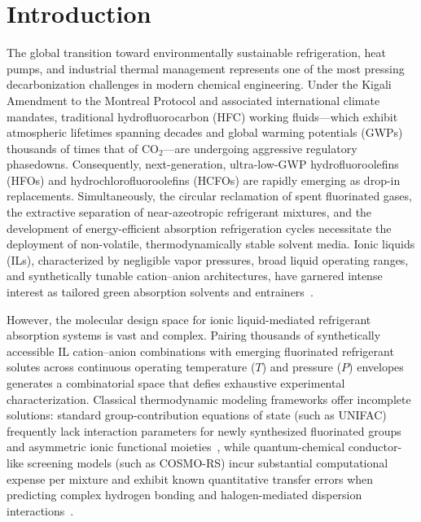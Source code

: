 \section{Introduction}
\label{sec:introduction}

The global transition toward environmentally sustainable refrigeration, heat pumps, and industrial thermal management represents one of the most pressing decarbonization challenges in modern chemical engineering. Under the Kigali Amendment to the Montreal Protocol and associated international climate mandates, traditional hydrofluorocarbon (HFC) working fluids---which exhibit atmospheric lifetimes spanning decades and global warming potentials (GWPs) thousands of times that of $\text{CO}_2$---are undergoing aggressive regulatory phasedowns. Consequently, next-generation, ultra-low-GWP hydrofluoroolefins (HFOs) and hydrochlorofluoroolefins (HCFOs) are rapidly emerging as drop-in replacements. Simultaneously, the circular reclamation of spent fluorinated gases, the extractive separation of near-azeotropic refrigerant mixtures, and the development of energy-efficient absorption refrigeration cycles necessitate the deployment of non-volatile, thermodynamically stable solvent media. Ionic liquids (ILs), characterized by negligible vapor pressures, broad liquid operating ranges, and synthetically tunable cation--anion architectures, have garnered intense interest as tailored green absorption solvents and entrainers~\cite{Qin2024_CAILD}.

However, the molecular design space for ionic liquid-mediated refrigerant absorption systems is vast and complex. Pairing thousands of synthetically accessible IL cation--anion combinations with emerging fluorinated refrigerant solutes across continuous operating temperature ($T$) and pressure ($P$) envelopes generates a combinatorial space that defies exhaustive experimental characterization. Classical thermodynamic modeling frameworks offer incomplete solutions: standard group-contribution equations of state (such as UNIFAC) frequently lack interaction parameters for newly synthesized fluorinated groups and asymmetric ionic functional moieties~\cite{Fredenslund1975_UNIFAC,Lei2014_UNIFAC_IL}, while quantum-chemical conductor-like screening models (such as COSMO-RS) incur substantial computational expense per mixture and exhibit known quantitative transfer errors when predicting complex hydrogen bonding and halogen-mediated dispersion interactions~\cite{Klamt2000_COSMORS}.

